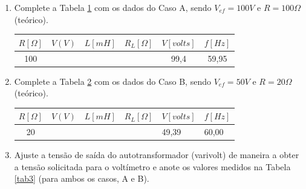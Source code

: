 \documentclass[a4paper,12pt,oneside,openany,table,xcdraw]{article}
\begin{document}
\begin{enumerate}[1 - ]
\item Complete a Tabela \ref{tab1} com os dados do Caso A, sendo $V_{ef}=100V$ e $R=100\Omega$ (teórico).

\begin{table}[h]
\centering
\def\arraystretch{1.35}
\captionsetup{font=scriptsize}
 \label{tab1}
\begin{tabular}{|c|c|c|c|c|c|}
\hline
$R [\Omega]$ & $V (V)$ & $L [mH]$ & $R_L [\Omega]$ & $V [volts]$ & $f [Hz]$ \\ \hline
       100      &         &          &                &      99,4       &     59,95     \\ \hline
\end{tabular}
\end{table}

\item Complete a Tabela \ref{tab2} com os dados do Caso B, sendo $V_{ef}=50V$ e $R=20\Omega$ (teórico).

\begin{table}[h]
\centering
\def\arraystretch{1.35}
\captionsetup{font=scriptsize}
 \label{tab2}
\begin{tabular}{|c|c|c|l|l|l|}
\hline
$R [\Omega]$ & $V (V)$ & $L [mH]$ & $R_L [\Omega]$ & $V [volts]$ & $f [Hz]$ \\ \hline
       20      &         &          &                &       49,39      &     60,00     \\ \hline
\end{tabular}
\end{table}

\item Ajuste a tensão de saída do autotransformador (varivolt) de maneira a obter a tensão solicitada para o voltímetro e anote os valores medidos na Tabela \ref{tab3} (para ambos os casos, A e B).
\begin{table}[H]
\centering
\def\arraystretch{1.35}
\captionsetup{font=scriptsize}
 \label{tab3}


\end{table}
\end{enumerate}
\end{document}
